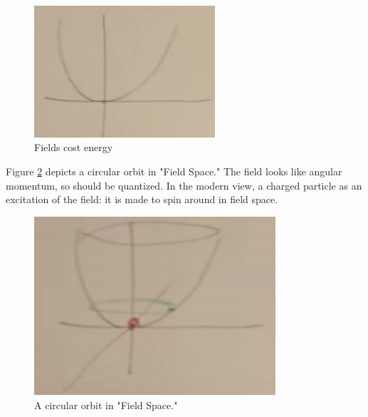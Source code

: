 \documentclass[]{article}
\begin{document}
\begin{figure}[H]
	\begin{center}
		\caption{Fields cost energy}\label{fig:higgs-fields-cost-energy}
		\includegraphics[width=0.6\textwidth]{higgs-fields-cost-energy}
	\end{center}
\end{figure}

Figure \ref{fig:2-appendix-field-circle} depicts a circular orbit in "Field Space." The field looks like angular momentum, so should be quantized. In the modern view,  a charged particle as an excitation of the field: it is made to spin around in field space.

\begin{figure}[H]
	\caption{A circular orbit in "Field Space."}\label{fig:2-appendix-field-circle}
	\includegraphics[width=0.8\textwidth]{2-appendix-field-circle}
\end{figure}
\end{document}
